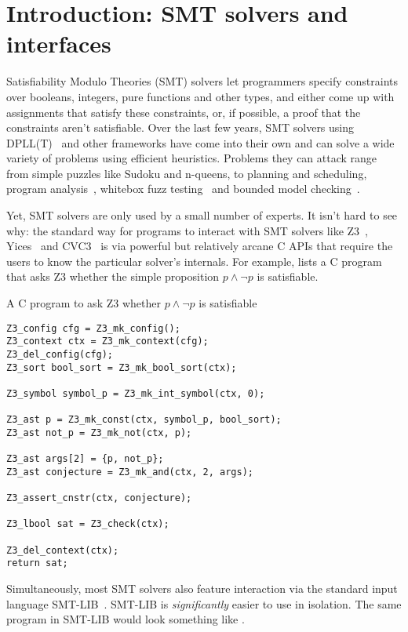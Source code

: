 \chapter{Introduction: SMT solvers and interfaces}
\label{chap:intro}

Satisfiability Modulo Theories (SMT) solvers let programmers specify constraints
over booleans, integers, pure functions and other types, and either come up
with assignments that satisfy these constraints, or, if possible, a proof that
the constraints aren't satisfiable. Over the last few years, SMT solvers using
DPLL(T)~\cite{dpllt:04} and other frameworks have come into their own and can
solve a wide variety of problems using efficient heuristics. Problems they can
attack range from simple puzzles like Sudoku and n-queens, to planning and
scheduling, program analysis~\cite{Gulwani:08}, whitebox fuzz
testing~\cite{Godefroid:08} and bounded model checking~\cite{Armando:09}.

Yet, SMT solvers are only used by a small number of experts. It isn't hard to
see why: the standard way for programs to interact with SMT solvers like
Z3~\cite{z3}, Yices~\cite{yices} and CVC3~\cite{cvc3} is via powerful but
relatively arcane C APIs that require the users to know the particular
solver's internals. For example,  lists a C program that
asks Z3 whether the simple proposition $p \wedge \neg p$ is satisfiable.

\begin{program}
\caption{A C program to ask Z3 whether $p \wedge \neg p$ is satisfiable}
\label{fig:c-prop}
\begin{verbatim}
Z3_config cfg = Z3_mk_config();
Z3_context ctx = Z3_mk_context(cfg);
Z3_del_config(cfg);
Z3_sort bool_sort = Z3_mk_bool_sort(ctx);

Z3_symbol symbol_p = Z3_mk_int_symbol(ctx, 0);

Z3_ast p = Z3_mk_const(ctx, symbol_p, bool_sort);
Z3_ast not_p = Z3_mk_not(ctx, p);

Z3_ast args[2] = {p, not_p};
Z3_ast conjecture = Z3_mk_and(ctx, 2, args);

Z3_assert_cnstr(ctx, conjecture);

Z3_lbool sat = Z3_check(ctx);

Z3_del_context(ctx);
return sat;
\end{verbatim}
\end{program}

Simultaneously, most SMT solvers also feature interaction via the standard
input language SMT-LIB~\cite{smtlib2:10}. SMT-LIB is \textit{significantly}
easier to use in isolation. The same program in SMT-LIB would look something
like .


